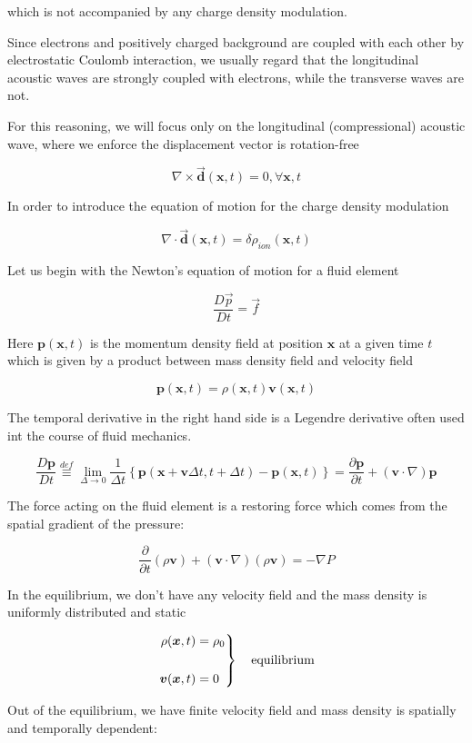 which is not accompanied by any charge density modulation. 

Since electrons and positively charged background are coupled with each other by electrostatic Coulomb interaction, we usually regard that the longitudinal acoustic waves are strongly coupled with electrons, while the transverse waves are not. 

For this reasoning, we will focus only on the longitudinal (compressional) acoustic wave, where we enforce the displacement vector is rotation-free

\[\nabla\times\vec{\bm{d}}(\bm{x},t) = 0,\forall\bm{x},t \]

In order to introduce the equation of motion for the charge density modulation

\[\nabla\cdot\vec{\bm{d}}(\bm{x},t) = \delta\rho_{ion}(\bm{x},t) \]

Let us begin with the Newton's equation of motion for a fluid element

\[\frac{D\vec{p}}{Dt} = \vec{f} \]

Here $\bm{p}(\bm{x},t)$ is the momentum density field at position $\bm{x}$ at a given time $t$ which is given by a product between mass density field and velocity field

\[\bm{p}(\bm{x},t) = \rho(\bm{x},t)\bm{v}(\bm{x},t) \]

The temporal derivative in the right hand side is a Legendre derivative often used int the course of fluid mechanics. 

\[\frac{D\bm{p}}{Dt} \overset{def}{\equiv}\lim_{\Delta\rightarrow0}\frac{1}{\Delta t} \left\{\bm{p}(\bm{x}+\bm{v}\Delta t,t+\Delta t) - \bm{p}(\bm{x},t)\right\} = \frac{\partial\bm{p}}{\partial t}+(\bm{v}\cdot\nabla)\bm{p} \]

The force acting on the fluid element is a restoring force which comes from the spatial gradient of the pressure:

\[\frac{\partial}{\partial t}(\rho\bm{v})+(\bm{v}\cdot\nabla)(\rho\bm{v}) = -\nabla P \]

In the equilibrium, we don't have any velocity field and the mass density is uniformly distributed and static

\[\left.\begin{split}
\rho(\bm{x},t) &= \rho_0\\
\ & \ \\
\bm{v}(\bm{x},t) &= 0
\end{split}\right\}\text{\quad equilibrium} \]

Out of the equilibrium, we have finite velocity field and mass density is spatially and temporally dependent:

